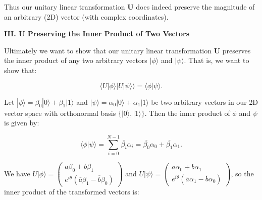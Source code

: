 \documentclass{article}
\begin{document}
Thus our unitary linear transformation \textbf{U} does indeed preserve the magnitude of an arbitrary (2D) vector (with complex coordinates).

\vspace{0.25in}

\textbf{III. U Preserving the Inner Product of Two Vectors}\par

\vspace{0.125in}

Ultimately we want to show that our unitary linear transformation \textbf{U} preserves the inner product of any two arbitrary vectors $|\phi\rangle$ and $|\psi\rangle$. That is, we want to show that:

\[
\langle U |\phi\rangle | U |\psi\rangle \rangle = \langle \phi | \psi \rangle.
\]

Let $|\phi\rangle = \beta_0 |0\rangle + \beta_1 |1\rangle$ and $|\psi\rangle = \alpha_0 |0\rangle + \alpha_1 |1\rangle$ be two arbitrary vectors in our 2D vector space with orthonormal basis $\{|0\rangle, |1\rangle\}$. Then the inner product of $\phi$ and $\psi$ is given by:

\[
\langle \phi | \psi \rangle = \sum_{i=0}^{N-1}\overline{\beta_i}\alpha_i =
\overline{\beta_0}\alpha_0 + \overline{\beta_1}\alpha_1.
\]

We have 
$U|\phi\rangle = \begin{pmatrix}
   a\beta_0 + b\beta_1\\
   e^{i\theta}(
   \overline{a} \beta_1 - \overline{b} \beta_0)
\end{pmatrix}$
and
$U|\psi\rangle = \begin{pmatrix}
   a\alpha_0 + b\alpha_1\\
   e^{i\theta}(
   \overline{a} \alpha_1 - \overline{b} \alpha_0)
\end{pmatrix}$,
so the inner product of the transformed vectors is:
\end{document}
